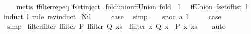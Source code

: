 \begin{isabellebody}
%
\isadelimproof
\ \ %
\endisadelimproof
%
\isatagproof
{}\isamarkupfalse%
\ {\isacharparenleft}metis\ ffilter{\isachardot}rep{\isacharunderscore}eq\ fset{\isacharunderscore}inject{\isacharparenright}%
\endisatagproof
{\isafoldproof}%
%
\isadelimproof
\isanewline
%
\endisadelimproof
\isanewline
{}\isamarkupfalse%
\ fold{\isacharunderscore}union{\isacharunderscore}ffUnion{\isacharcolon}\ {\isachardoublequoteopen}fold\ {\isacharparenleft}{\isacharbar}{\isasymunion}{\isacharbar}{\isacharparenright}\ l\ {\isacharbraceleft}{\isacharbar}{\isacharbar}{\isacharbraceright}\ {\isacharequal}\ ffUnion\ {\isacharparenleft}fset{\isacharunderscore}of{\isacharunderscore}list\ l{\isacharparenright}{\isachardoublequoteclose}\isanewline
%
\isadelimproof
%
\endisadelimproof
%
\isatagproof
{}\isamarkupfalse%
{\isacharparenleft}induct\ l\ rule{\isacharcolon}\ rev{\isacharunderscore}induct{\isacharparenright}\isanewline
{}\isamarkupfalse%
\ Nil\isanewline
\ \ \isamarkupfalse%
\ \isamarkupfalse%
\ {\isacharquery}case\ \isamarkupfalse%
\ simp\isanewline
{}\isamarkupfalse%
\isanewline
\ \ \isamarkupfalse%
\ {\isacharparenleft}snoc\ a\ l{\isacharparenright}\isanewline
\ \ \isamarkupfalse%
\ \isamarkupfalse%
\ {\isacharquery}case\isanewline
\ \ \ \ \isamarkupfalse%
\ simp\isanewline
{}\isamarkupfalse%
%
\endisatagproof
{\isafoldproof}%
%
\isadelimproof
\isanewline
%
\endisadelimproof
\isanewline
{}\isamarkupfalse%
\ filter{\isacharunderscore}filter{\isacharcolon}\ {\isachardoublequoteopen}ffilter\ P\ {\isacharparenleft}ffilter\ Q\ xs{\isacharparenright}\ {\isacharequal}\ ffilter\ {\isacharparenleft}{\isasymlambda}x{\isachardot}\ Q\ x\ {\isasymand}\ P\ x{\isacharparenright}\ xs{\isachardoublequoteclose}\isanewline
%
\isadelimproof
\ \ %
\endisadelimproof
%
\isatagproof
{}\isamarkupfalse%
\ auto%
\endisatagproof
{\isafoldproof}%
%
\isadelimproof
\isanewline
%
\endisadelimproof
%
\isadelimtheory
%
\endisadelimtheory
%
\isatagtheory
{}\isamarkupfalse%
%
\endisatagtheory
{\isafoldtheory}%
%
\isadelimtheory
%
\endisadelimtheory
%
\end{isabellebody}%
\endinput
